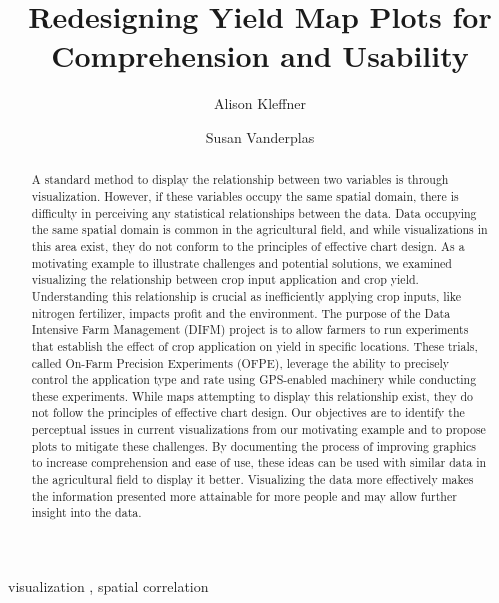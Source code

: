 \documentclass[
  authoryear,
  preprint,
  3p]{elsarticle}
\begin{document}
\begin{frontmatter}
\title{Redesigning Yield Map Plots for Comprehension and Usability}
\author[1]{Alison Kleffner%
%
}
\author[2]{Susan Vanderplas%
%
}



        
\begin{abstract}
A standard method to display the relationship between two variables is
through visualization. However, if these variables occupy the same
spatial domain, there is difficulty in perceiving any statistical
relationships between the data. Data occupying the same spatial domain
is common in the agricultural field, and while visualizations in this
area exist, they do not conform to the principles of effective chart
design. As a motivating example to illustrate challenges and potential
solutions, we examined visualizing the relationship between crop input
application and crop yield. Understanding this relationship is crucial
as inefficiently applying crop inputs, like nitrogen fertilizer, impacts
profit and the environment. The purpose of the Data Intensive Farm
Management (DIFM) project is to allow farmers to run experiments that
establish the effect of crop application on yield in specific locations.
These trials, called On-Farm Precision Experiments (OFPE), leverage the
ability to precisely control the application type and rate using
GPS-enabled machinery while conducting these experiments. While maps
attempting to display this relationship exist, they do not follow the
principles of effective chart design. Our objectives are to identify the
perceptual issues in current visualizations from our motivating example
and to propose plots to mitigate these challenges. By documenting the
process of improving graphics to increase comprehension and ease of use,
these ideas can be used with similar data in the agricultural field to
display it better. Visualizing the data more effectively makes the
information presented more attainable for more people and may allow
further insight into the data.
\end{abstract}





\begin{keyword}
    visualization \sep 
    spatial correlation
\end{keyword}
\end{frontmatter}
    \ifdefined\Shaded\renewenvironment{Shaded}{\begin{tcolorbox}[interior hidden, enhanced, sharp corners, breakable, boxrule=0pt, frame hidden, borderline west={3pt}{0pt}{shadecolor}]}{\end{tcolorbox}}\fi
\end{document}
